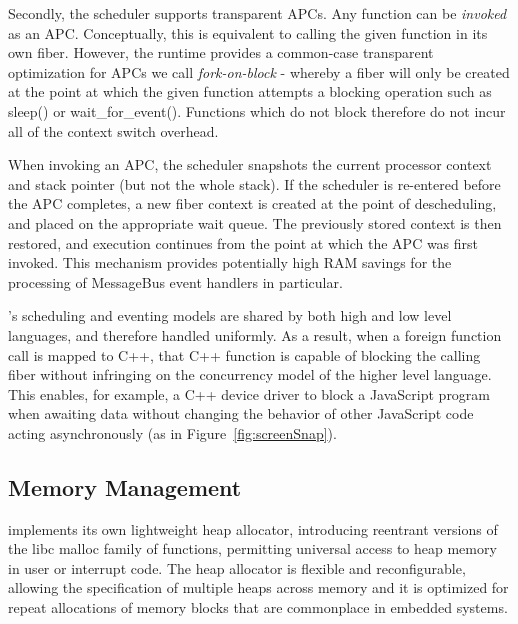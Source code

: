 Secondly, the \CO scheduler supports transparent APCs. Any function can be \emph{invoked} as an APC. Conceptually, this is equivalent to calling the given function in its own fiber. However, the \CO runtime provides a common-case transparent optimization for APCs we call \emph{fork-on-block} - whereby a fiber will only be created at the point at which the given function attempts a blocking operation such as sleep() or wait\_for\_event(). Functions which do not block therefore do not incur all of the context switch overhead.

When invoking an APC, the scheduler snapshots the current processor context and stack pointer (but not the whole stack). If the scheduler is re-entered before the APC completes, a new fiber context is created at the point of descheduling, and placed on the appropriate wait queue. The previously stored context is then restored, and execution continues from the point at which the APC was first invoked. This mechanism provides potentially high RAM savings for the processing of MessageBus event handlers in particular.

\CON's scheduling and eventing models are shared by both high and low level languages, and therefore handled uniformly. As a result, when a foreign function call is mapped to C++, that C++ function is capable of blocking the calling fiber without infringing on the concurrency model of the higher level language. This enables, for example, a C++ device driver to block a JavaScript program when awaiting data without changing the behavior of other JavaScript code acting asynchronously (as in Figure~\ref{fig:screenSnap}).


\subsection{Memory Management}
\CO implements its own lightweight heap allocator, introducing reentrant versions of the libc malloc family of functions, permitting universal access to heap memory in user or interrupt code. The heap allocator is flexible and reconfigurable, allowing the specification of multiple heaps across memory and it is optimized for repeat allocations of memory blocks that are commonplace in embedded systems.

